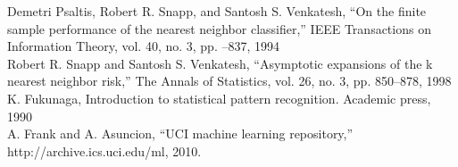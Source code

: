 \documentclass{article}
\begin{document}
	\noindent [35] Demetri Psaltis, Robert R. Snapp, and Santosh S.
	Venkatesh, “On the finite sample performance \indent of the
	nearest neighbor classifier,” IEEE Transactions on Information
	Theory, vol. 40, no. 3, pp. –837, 1994
	\\[0.5ex]
	
	\noindent [36] Robert R. Snapp and Santosh S. Venkatesh, “Asymptotic
	expansions of the k nearest neighbor \indent risk,” The
	Annals of Statistics, vol. 26, no. 3, pp. 850–878, 1998
	\\[0.5ex]
	
	\noindent [37]  K. Fukunaga, Introduction to statistical pattern recognition. Academic
	press, 1990
	\\[0.5ex]
	
	\noindent [38] A. Frank and A. Asuncion, “UCI machine learning
	repository,” http://archive.ics.uci.edu/ml, 2010.
	\\[0.5ex]
	
\end{document}
